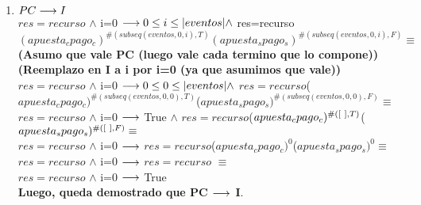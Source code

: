 \documentclass[10pt,a4paper]{article}
\begin{document}
\begin{flushleft}
\begin{enumerate} \setlength\itemsep{4mm}
	\item \textbf{$PC \longrightarrow I$} \\
	\vspace{2mm}
	$res= recurso$ $\wedge$ i=0 $\longrightarrow 0\leq i\leq|eventos| \wedge$ res=recurso$(apuesta_cpago_c)^{\#(subseq(eventos,0,i),T)}(apuesta_spago_s)^{\#(subseq(eventos,0,i),F)} \equiv$\\
	\vspace{3mm}
	\textbf{(Asumo que vale PC (luego vale cada termino que lo compone))}\\
	\vspace{3mm}
	\textbf{(Reemplazo en I a i por i=0 (ya que asumimos que vale))}\\
	\vspace{3mm}
	$res= recurso$ $\wedge$ i=0 $\longrightarrow 0\leq 0\leq|eventos| \wedge$ $res=recurso$($apuesta_cpago_c)^{\#(subseq(eventos,0,0),T)}$($apuesta_spago_s)^{\#(subseq(eventos,0,0),F)} \equiv$\\
	\vspace{2mm}
	$res= recurso$ $\wedge$ i=0  $\longrightarrow$  True $ \wedge$ $res=recurso$($apuesta_cpago_c)^{\#([\ ],T)}$($apuesta_spago_s)^{\#([\ ],F)} \equiv$ \\
	\vspace{2mm}
	$res= recurso$ $\wedge$ i=0  $\longrightarrow$ $res=recurso$($apuesta_cpago_c)^{0}$($apuesta_spago_s)^{0} \equiv $\\
	\vspace{2mm}
	$res= recurso$ $\wedge$ i=0  $\longrightarrow$ $res=recurso$ $\equiv $\\
	\vspace{2mm}
	$res= recurso$ $\wedge$ i=0  $\longrightarrow$ True \\
	\vspace{3mm}
	\textbf{Luego, queda demostrado que PC $\longrightarrow$ I}.\\


\end{enumerate}
\end{flushleft}
\end{document}
